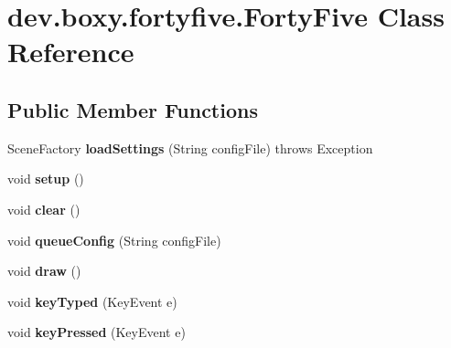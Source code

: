 \hypertarget{classdev_1_1boxy_1_1fortyfive_1_1_forty_five}{
\section{dev.boxy.fortyfive.FortyFive Class Reference}
\label{de/df3/classdev_1_1boxy_1_1fortyfive_1_1_forty_five}
}
\subsection*{Public Member Functions}
\begin{DoxyCompactItemize}
\item 
\hypertarget{classdev_1_1boxy_1_1fortyfive_1_1_forty_five_a748fe42b926ce862ed95edcbaedc00d9}{
SceneFactory {\bfseries loadSettings} (String configFile)  throws Exception }
\label{de/df3/classdev_1_1boxy_1_1fortyfive_1_1_forty_five_a748fe42b926ce862ed95edcbaedc00d9}

\item 
\hypertarget{classdev_1_1boxy_1_1fortyfive_1_1_forty_five_a2736c9bcd392dd80f9292674e07fdbc1}{
void {\bfseries setup} ()}
\label{de/df3/classdev_1_1boxy_1_1fortyfive_1_1_forty_five_a2736c9bcd392dd80f9292674e07fdbc1}

\item 
\hypertarget{classdev_1_1boxy_1_1fortyfive_1_1_forty_five_a1963dcafff81699853b88015c865432b}{
void {\bfseries clear} ()}
\label{de/df3/classdev_1_1boxy_1_1fortyfive_1_1_forty_five_a1963dcafff81699853b88015c865432b}

\item 
\hypertarget{classdev_1_1boxy_1_1fortyfive_1_1_forty_five_a131013558c67489f4b768e29c6565f18}{
void {\bfseries queueConfig} (String configFile)}
\label{de/df3/classdev_1_1boxy_1_1fortyfive_1_1_forty_five_a131013558c67489f4b768e29c6565f18}

\item 
\hypertarget{classdev_1_1boxy_1_1fortyfive_1_1_forty_five_a714383a1f7525880ab1b8464adc70b9b}{
void {\bfseries draw} ()}
\label{de/df3/classdev_1_1boxy_1_1fortyfive_1_1_forty_five_a714383a1f7525880ab1b8464adc70b9b}

\item 
\hypertarget{classdev_1_1boxy_1_1fortyfive_1_1_forty_five_a6e9b77fa2bbc3f83c238d9f094848e96}{
void {\bfseries keyTyped} (KeyEvent e)}
\label{de/df3/classdev_1_1boxy_1_1fortyfive_1_1_forty_five_a6e9b77fa2bbc3f83c238d9f094848e96}

\item 
\hypertarget{classdev_1_1boxy_1_1fortyfive_1_1_forty_five_a49996a8f38b4465dbb3b4e8e197805b2}{
void {\bfseries keyPressed} (KeyEvent e)}
\label{de/df3/classdev_1_1boxy_1_1fortyfive_1_1_forty_five_a49996a8f38b4465dbb3b4e8e197805b2}


\end{DoxyCompactItemize}
